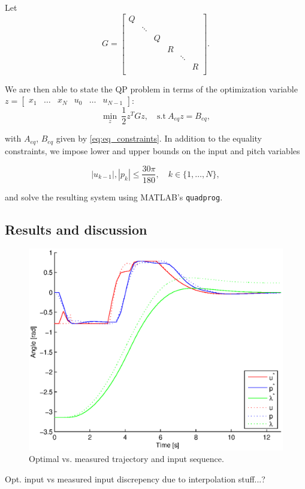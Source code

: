 Let 
\begin{equation*}
	G =
	\begin{bmatrix}
	Q	&&&&&		\\
		&\ddots&&&&	\\
		&&Q&&&		\\
		&&&R&&		\\
		&&&&\ddots&	\\
		&&&&&R		\\
	\end{bmatrix}.
\end{equation*}

 We are then able to state the QP problem in terms of the optimization variable $z = \begin{bmatrix} x_1 & \dots & x_N & u_0 & \dots & u_{N-1} \end{bmatrix}$:
\begin{equation*}
	\min_z \ \frac{1}{2} z^T G z, \quad \textrm{s.t}\ A_{eq} z = B_{eq},
\end{equation*}

with $A_{eq}$, $B_{eq}$ given by \eqref{eq:eq_constraints}. In addition to the equality constraints, we impose lower and upper bounds on the input and pitch variables

\begin{equation*}
	|u_{k-1}|, |p_k| \le \frac{30 \pi}{180}, \quad k \in \{1, \dots, N\},
\end{equation*}

and solve the resulting system using MATLAB's \texttt{quadprog}.

\subsection{Results and discussion}

\begin{figure}[hp]
	\centering
		\includegraphics[width=1.00\textwidth]{figures/2/opt_vs_meas_traj.eps}
	\caption{Optimal vs. measured trajectory and input sequence.}
	\label{fig:opt_traj}
\end{figure}

Opt. input vs measured input discrepency due to interpolation stuff...?

